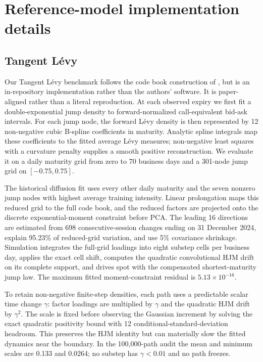 \clearpage
\section{Reference-model implementation details}
\label{app:reference-models}

\subsection{Tangent L\'evy}
\label{app:tangent-levy}

Our Tangent L\'evy benchmark follows the code book construction of
\citet{TangentLevy}, but is an in-repository implementation rather than the
authors' software.  It is paper-aligned rather than a literal reproduction.
At each observed expiry we first fit a double-exponential jump density to
forward-normalized call-equivalent bid-ask intervals.  For each jump node, the
forward L\'evy density is then represented by 12 non-negative cubic B-spline
coefficients in maturity.  Analytic spline integrals map these coefficients to
the fitted average L\'evy measures; non-negative least squares with a curvature
penalty supplies a smooth positive reconstruction.  We evaluate it on a daily
maturity grid from zero to 70 business days and a 301-node jump grid on
$[-0.75,0.75]$.

The historical diffusion fit uses every other daily maturity and the seven
nonzero jump nodes with highest average training intensity.  Linear
prolongation maps this reduced grid to the full code book, and the reduced
factors are projected onto the discrete exponential-moment constraint before
PCA.  The leading 16 directions are estimated from 698 consecutive-session
changes ending on 31 December 2024, explain 95.23\% of reduced-grid variation,
and use 5\% covariance shrinkage.  Simulation integrates the full-grid
loadings into eight substep cells per business day, applies the exact cell
shift, computes the quadratic convolutional HJM drift on its complete support,
and drives spot with the compensated shortest-maturity jump law.  The maximum
fitted moment-constraint residual is $5.13\times10^{-16}$.

To retain non-negative finite-step densities, each path uses a predictable
scalar time change $\gamma$: factor loadings are multiplied by $\gamma$ and
the quadratic HJM drift by $\gamma^2$.  The scale is fixed before observing the
Gaussian increment by solving the exact quadratic positivity bound with
12 conditional-standard-deviation headroom.  This preserves the HJM identity
but can materially slow the fitted dynamics near the boundary.  In the
100,000-path audit the mean and minimum scales are 0.133 and 0.0264; no substep
has $\gamma<0.01$ and no path freezes.

